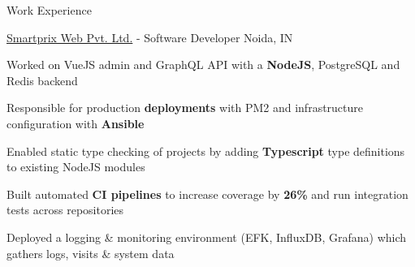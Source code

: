 \documentclass[../resume.tex]{subfiles}
\begin{document}
\begin{rSection}{Work Experience}
\begin{rSubsection}
\end{rSubsection}

\begin{rSubsection}
    {\href{https://go.rohit.page/smpx}{Smartprix Web Pvt. Ltd.}}
    {  -  }
    {Software Developer}
    {Noida, IN}

    \item Worked on VueJS admin and GraphQL API with a \textbf{NodeJS}, PostgreSQL and Redis backend
    \item Responsible for production \textbf{deployments} with PM2 and infrastructure configuration with \textbf{Ansible}
    \item Enabled static type checking of projects by adding \textbf{Typescript} type definitions to existing NodeJS modules
    \item Built automated \textbf{CI pipelines} to increase coverage by \textbf{26\%} and run integration tests across repositories
    \item Deployed a logging \& monitoring environment (EFK, InfluxDB, Grafana) which gathers logs, visits \& system data

\end{rSubsection}


\end{rSection}
\end{document}
